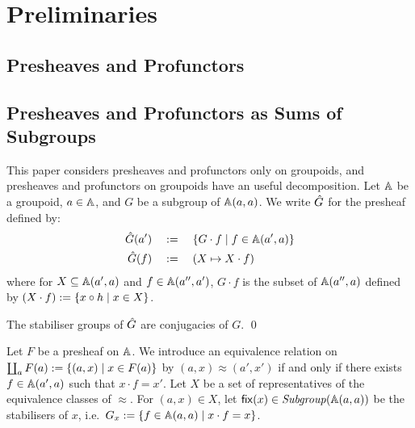 \section{Preliminaries}

\subsection{Presheaves and Profunctors}



\subsection{Presheaves and Profunctors as Sums of Subgroups}
This paper considers presheaves and profunctors only on groupoids, and presheaves and profunctors on groupoids have an useful decomposition.
Let \( \mathbb{A} \) be a groupoid, \( a \in \mathbb{A} \), and \( G \) be a subgroup of \( \mathbb{A}(a,a) \).
We write \( \hat{G} \) for the presheaf defined by:
\begin{align*}
    \hat{G}(a')
    &\quad:=\quad
    \{ G \cdot f \mid f \in \mathbb{A}(a', a) \}
    \\
    \hat{G}(f)
    &\quad:=\quad
    (X \mapsto X \cdot f)
\end{align*}
where for \( X \subseteq \mathbb{A}(a', a) \) and \( f \in \mathbb{A}(a'', a') \), \( G \cdot f \) is the subset of \( \mathbb{A}(a'', a) \) defined by \( (X \cdot f) := \{ x \circ h \mid x \in X \} \).

\begin{proposition}
    The stabiliser groups of \( \hat{G} \) are conjugacies of \( G \).
    \qed
\end{proposition}

\newcommand{\Stabiliser}{\mathsf{fix}}

Let \( F \) be a presheaf on \( \mathbb{A} \).
We introduce an equivalence relation on \( \coprod_a F(a) := \{ (a, x) \mid x \in F(a) \} \) by \( (a, x) \approx (a', x') \) if and only if there exists \( f \in \mathbb{A}(a', a) \) such that \( x \cdot f = x' \).
Let \( X \) be a set of representatives of the equivalence classes of \( \approx \).
For \( (a, x) \in X \), let \( \Stabiliser(x) \in \Subgroup(\Grp(a,a)) \) be the stabilisers of \( x \), i.e.~\( G_x := \{ f \in \mathbb{A}(a,a) \mid x \cdot f = x \} \).

